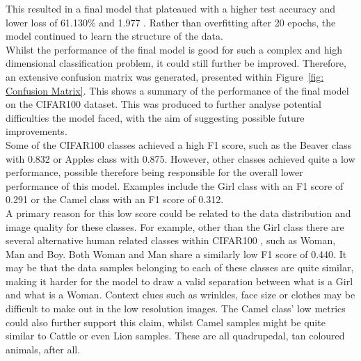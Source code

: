 \documentclass[11pt]{article}
\def\DATASET{CIFAR100 }
\def\FINALACCURACY{61.130\% }
\def\FINALLOSS{1.977 }
\begin{document}
This resulted in a final model that plateaued with a higher test accuracy and lower loss of \FINALACCURACY and \FINALLOSS. Rather than overfitting after 20 epochs, the model continued to learn the structure of the data.\\
Whilst the performance of the final model is good for such a complex and high dimensional classification problem, it could still further be improved. Therefore, an extensive confusion matrix was generated, presented within Figure~\ref{fig: Confusion Matrix}. This shows a summary of the performance of the final model on the \DATASET dataset. This was produced to further analyse potential difficulties the model faced, with the aim of suggesting possible future improvements.\\
Some of the \DATASET classes achieved a high F1 score, such as the Beaver class with 0.832 or Apples class with 0.875. However, other classes achieved quite a low performance, possible therefore being responsible for the overall lower performance of this model. Examples include the Girl class with an F1 score of 0.291 or the Camel class with an F1 score of 0.312.\\
A primary reason for this low score could be related to the data distribution and image quality for these classes. For example, other than the Girl class there are several alternative human related classes within \DATASET, such as Woman, Man and Boy. Both Woman and Man share a similarly low F1 score of 0.440. It may be that the data samples belonging to each of these classes are quite similar, making it harder for the model to draw a valid separation between what is a Girl and what is a Woman. Context clues such as wrinkles, face size or clothes may be difficult to make out in the low resolution images. The Camel class' low metrics could also further support this claim, whilst Camel samples might be quite similar to Cattle or even Lion samples. These are all quadrupedal, tan coloured animals, after all.\\
\end{document}
